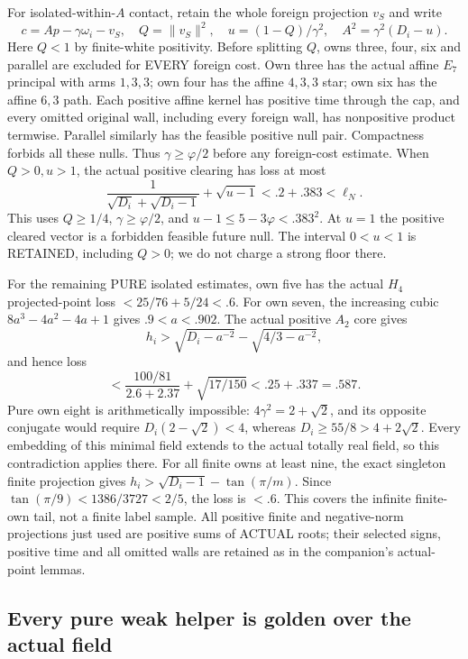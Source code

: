 \documentclass[11pt]{article}
\begin{document}
For isolated-within-\(A\) contact, retain the whole foreign
projection \(v_S\) and write
\[
 c=Ap-\gamma\omega_i-v_S,\quad Q=\|v_S\|^2,\quad
 u=(1-Q)/\gamma^2,\quad A^2=\gamma^2(D_i-u).
\]
Here \(Q<1\) by finite-white positivity.
Before splitting \(Q\), owns three, four, six and parallel
are excluded for EVERY foreign cost.
Own three has the actual affine \(E_7\) principal with arms
\(1,3,3\); own four has the affine \(4,3,3\) star;
own six has the affine \(6,3\) path.
Each positive affine kernel has positive time through the cap,
and every omitted original wall, including every foreign wall,
has nonpositive product termwise.
Parallel similarly has the feasible positive null pair.
Compactness forbids all these nulls.
Thus \(\gamma\ge\varphi/2\) before any foreign-cost estimate.
When \(Q>0,u>1\), the actual positive clearing has loss at most
\[
 {\frac{1}{\sqrt{D_i}+\sqrt{D_i-1}}}+\sqrt{u-1}
 <.2+.383<\ell_N .
\]
This uses \(Q\ge1/4\), \(\gamma\ge\varphi/2\), and
\(u-1\le5-3\varphi<.383^2\).
At \(u=1\) the positive cleared vector is a forbidden feasible
future null.
The interval \(0<u<1\) is RETAINED, including \(Q>0\);
we do not charge a strong floor there.

For the remaining PURE isolated estimates, own five has the
actual \(H_4\) projected-point loss
\(<25/76+5/24<.6\).
For own seven, the increasing cubic
\(8a^3-4a^2-4a+1\) gives \(.9<a<.902\).
The actual positive \(A_2\) core gives
\[
 h_i>\sqrt{D_i-a^{-2}}-\sqrt{4/3-a^{-2}},
\]
and hence loss
\[
 <{\frac{100/81}{2.6+2.37}}+\sqrt{17/150}
 <.25+.337=.587 .
\]
Pure own eight is arithmetically impossible:
\(4\gamma^2=2+\sqrt2\), and its opposite conjugate would require
\(D_i(2-\sqrt2)<4\), whereas
\(D_i\ge55/8>4+2\sqrt2\).
Every embedding of this minimal field extends to the actual
totally real field, so this contradiction applies there.
For all finite owns at least nine, the exact singleton finite
projection gives
\(h_i>\sqrt{D_i-1}-\tan(\pi/m)\).
Since \(\tan(\pi/9)<1386/3727<2/5\), the loss is \(<.6\).
This covers the infinite finite-own tail, not a finite label sample.
All positive finite and negative-norm projections just used are
positive sums of ACTUAL roots; their selected signs, positive
time and all omitted walls are retained as in the companion's
actual-point lemmas.

\subsection{Every pure weak helper is golden over the actual field}
\label{app:arithgoldenfield}
\end{document}

